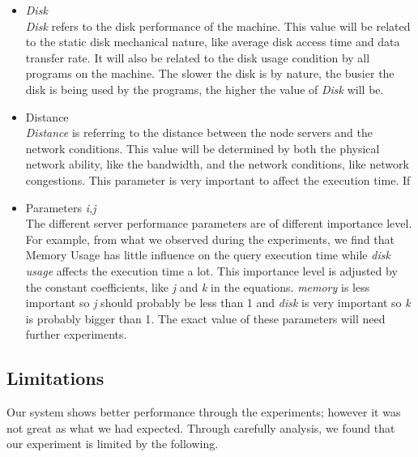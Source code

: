 \begin{itemize}
\item{\textit{Disk}}\\
\textit{Disk} refers to the disk performance of the machine. This value will be related to the static disk mechanical nature, like average disk access time and data transfer rate. It will also be related to the disk usage condition by all programs on the machine. The slower the disk is by nature, the busier the disk is being used by the programs, the higher the value of \textit{Disk} will be. 
\item{Distance}\\
\textit{Distance} is referring to the distance between the node servers and the network conditions. This value will be determined by both the physical network ability, like the bandwidth, and the network conditions, like network congestions. This parameter is very important to affect the execution time. If  
\item{Parameters \textit{i,j}}\\
The different server performance parameters are of different importance level. For example, from what we observed during the experiments, we find that Memory Usage has little influence on the query execution time while \textit{disk usage} affects the execution time a lot. This importance level is adjusted by the constant coefficients, like \textit{j} and \textit{k} in the equations. \textit{memory} is less important so \textit{j} should probably be less than 1 and \textit{disk} is very important so \textit{k} is probably bigger than 1. The exact value of these parameters will need further experiments. 

\end{itemize}

\subsection{Limitations}
Our system shows better performance through the experiments; however it was not great as what we had expected. Through carefully analysis, we found that our experiment is limited by the following.

